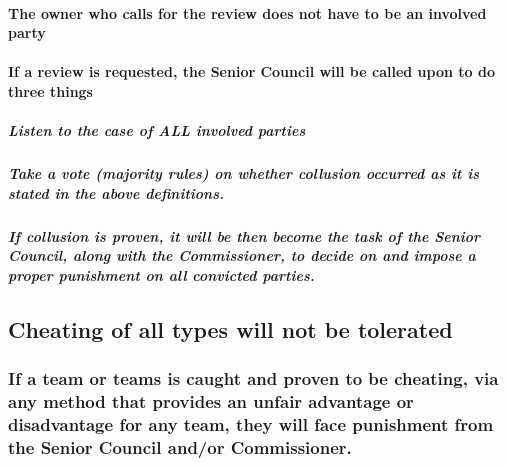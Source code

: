 \documentclass[]{book}
\let\oldparagraph\paragraph
\renewcommand{\paragraph}[1]{\oldparagraph{#1}\mbox{}}
\let\oldsubparagraph\subparagraph
\renewcommand{\subparagraph}[1]{\oldsubparagraph{#1}\mbox{}}
\begin{document}
\hypertarget{the-owner-who-calls-for-the-review-does-not-have-to-be-an-involved-party}{%
\paragraph{The owner who calls for the review does not have to be an involved party}\label{the-owner-who-calls-for-the-review-does-not-have-to-be-an-involved-party}}

\hypertarget{if-a-review-is-requested-the-senior-council-will-be-called-upon-to-do-three-things}{%
\paragraph{If a review is requested, the Senior Council will be called upon to do three things}\label{if-a-review-is-requested-the-senior-council-will-be-called-upon-to-do-three-things}}

\hypertarget{listen-to-the-case-of-all-involved-parties}{%
\subparagraph{Listen to the case of ALL involved parties}\label{listen-to-the-case-of-all-involved-parties}}

\hypertarget{take-a-vote-majority-rules-on-whether-collusion-occurred-as-it-is-stated-in-the-above-definitions.}{%
\subparagraph{Take a vote (majority rules) on whether collusion occurred as it is stated in the above definitions.}\label{take-a-vote-majority-rules-on-whether-collusion-occurred-as-it-is-stated-in-the-above-definitions.}}

\hypertarget{if-collusion-is-proven-it-will-be-then-become-the-task-of-the-senior-council-along-with-the-commissioner-to-decide-on-and-impose-a-proper-punishment-on-all-convicted-parties.}{%
\subparagraph{If collusion is proven, it will be then become the task of the Senior Council, along with the Commissioner, to decide on and impose a proper punishment on all convicted parties.}\label{if-collusion-is-proven-it-will-be-then-become-the-task-of-the-senior-council-along-with-the-commissioner-to-decide-on-and-impose-a-proper-punishment-on-all-convicted-parties.}}

\hypertarget{cheating-of-all-types-will-not-be-tolerated}{%
\subsection{Cheating of all types will not be tolerated}\label{cheating-of-all-types-will-not-be-tolerated}}

\hypertarget{if-a-team-or-teams-is-caught-and-proven-to-be-cheating-via-any-method-that-provides-an-unfair-advantage-or-disadvantage-for-any-team-they-will-face-punishment-from-the-senior-council-andor-commissioner.}{%
\subsubsection{If a team or teams is caught and proven to be cheating, via any method that provides an unfair advantage or disadvantage for any team, they will face punishment from the Senior Council and/or Commissioner.}\label{if-a-team-or-teams-is-caught-and-proven-to-be-cheating-via-any-method-that-provides-an-unfair-advantage-or-disadvantage-for-any-team-they-will-face-punishment-from-the-senior-council-andor-commissioner.}}
\end{document}
